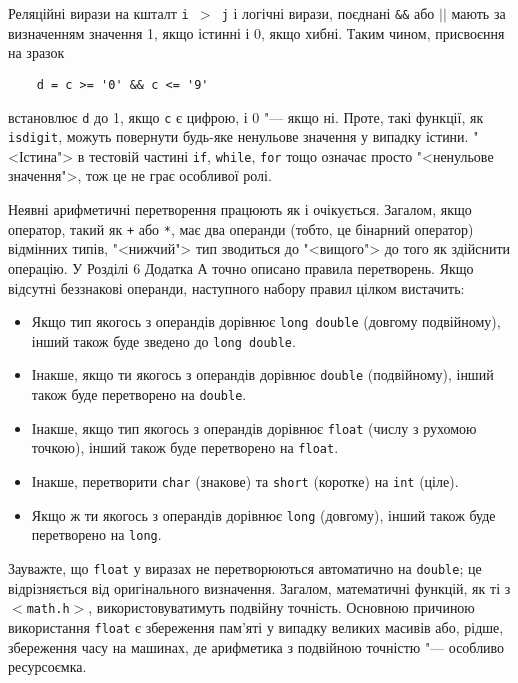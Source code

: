 \documentclass[a4paper,12pt]{book}
\begin{document}
  Реляційні вирази на кшталт \texttt{i \mbox{$>$} j} і логічні вирази, поєднані
  \texttt{\&\&} або \texttt{\mbox{$|$}\mbox{$|$}} мають за визначенням значення 1, якщо істинні і 0,
  якщо хибні. Таким чином, присвоєння на зразок
  \begin{verbatim}
    d = c >= '0' && c <= '9'
  \end{verbatim}
  встановлює \texttt{d} до 1, якщо \texttt{c} є цифрою, і 0 "--- якщо ні. Проте, такі
  функції, як \texttt{isdigit}, можуть повернути будь-яке ненульове значення у випадку
  істини. "<Істина"> в тестовій частині \texttt{if}, \texttt{while},
  \texttt{for} тощо означає просто "<ненульове значення">, тож це не грає
  особливої ролі.

  Неявні арифметичні перетворення працюють як і очікується. Загалом, якщо оператор, такий
  як \texttt{+} або \texttt{*}, має два операнди (тобто, це бінарний оператор) відмінних
  типів, "<нижчий"> тип зводиться до "<вищого"> до того як здійснити
  операцію. У Розділі 6 Додатка А точно описано правила перетворень.
  Якщо відсутні беззнакові операнди, наступного набору правил цілком вистачить:
    \begin{itemize}    \item       Якщо тип якогось з операндів дорівнює
      \texttt{long double} (довгому подвійному), інший також буде зведено до
      \texttt{long double}.
        \item       Інакше, якщо ти якогось з операндів дорівнює
      \texttt{double} (подвійному), інший також буде перетворено на
      \texttt{double}.
        \item       Інакше, якщо тип якогось з операндів дорівнює
      \texttt{float} (числу з рухомою точкою), інший також буде перетворено на
      \texttt{float}.
        \item       Інакше, перетворити
      \texttt{char} (знакове) та
      \texttt{short} (коротке) на
      \texttt{int} (ціле).
        \item       Якщо ж ти якогось з операндів дорівнює
      \texttt{long} (довгому), інший також буде перетворено на
      \texttt{long}.
      \end{itemize}

  Зауважте, що \texttt{float} у виразах не перетворюються автоматично на \texttt{double};
  це відрізняється від оригінального визначення. Загалом, математичні функцій, як ті з
  \texttt{\mbox{$<$}math.h\mbox{$>$}}, використовуватимуть подвійну точність. Основною причиною
  використання \texttt{float} є збереження пам'яті у випадку великих масивів або, рідше,
  збереження часу на машинах, де арифметика з подвійною точністю "--- особливо
  ресурсоємка.
\end{document}
